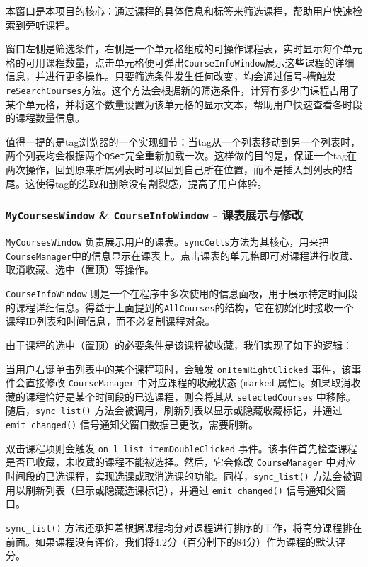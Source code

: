 \documentclass{article}
\begin{document}
本窗口是本项目的核心：通过课程的具体信息和标签来筛选课程，帮助用户快速检索到旁听课程。

窗口左侧是筛选条件，右侧是一个单元格组成的可操作课程表，实时显示每个单元格的可用课程数量，点击单元格便可弹出\texttt{CourseInfoWindow}展示这些课程的详细信息，并进行更多操作。只要筛选条件发生任何改变，均会通过信号-槽触发\texttt{reSearchCourses}方法。这个方法会根据新的筛选条件，计算有多少门课程占用了某个单元格，并将这个数量设置为该单元格的显示文本，帮助用户快速查看各时段的课程数量信息。

值得一提的是tag浏览器的一个实现细节：当tag从一个列表移动到另一个列表时，两个列表均会根据两个\texttt{QSet}完全重新加载一次。这样做的目的是，保证一个tag在两次操作，回到原来所属列表时可以回到自己所在位置，而不是插入到列表的结尾。这使得tag的选取和删除没有割裂感，提高了用户体验。

\subsubsection{\texttt{MyCoursesWindow} \& \texttt{CourseInfoWindow} - 课表展示与修改}

\texttt{MyCoursesWindow} 负责展示用户的课表。\texttt{syncCells}方法为其核心，用来把\texttt{CourseManager}中的信息显示在课表上。点击课表的单元格即可对课程进行收藏、取消收藏、选中（置顶）等操作。

\texttt{CourseInfoWindow} 则是一个在程序中多次使用的信息面板，用于展示特定时间段的课程详细信息。得益于上面提到的\texttt{AllCourses}的结构，它在初始化时接收一个课程ID列表和时间信息，而不必复制课程对象。

由于课程的选中（置顶）的必要条件是该课程被收藏，我们实现了如下的逻辑：

当用户右键单击列表中的某个课程项时，会触发 \texttt{onItemRightClicked} 事件，该事件会直接修改 \texttt{CourseManager} 中对应课程的收藏状态 (\texttt{marked} 属性)。如果取消收藏的课程恰好是某个时间段的已选课程，则会将其从 \texttt{selectedCourses} 中移除。随后，\texttt{sync\_list()} 方法会被调用，刷新列表以显示或隐藏收藏标记，并通过 \texttt{emit changed()} 信号通知父窗口数据已更改，需要刷新。

双击课程项则会触发 \texttt{on\_l\_list\_itemDoubleClicked} 事件。该事件首先检查课程是否已收藏，未收藏的课程不能被选择。然后，它会修改 \texttt{CourseManager} 中对应时间段的已选课程，实现选课或取消选课的功能。同样，\texttt{sync\_list()} 方法会被调用以刷新列表（显示或隐藏选课标记），并通过 \texttt{emit changed()} 信号通知父窗口。

\texttt{sync\_list()} 方法还承担着根据课程均分对课程进行排序的工作，将高分课程排在前面。如果课程没有评价，我们将4.2分（百分制下的84分）作为课程的默认评分。
\end{document}

